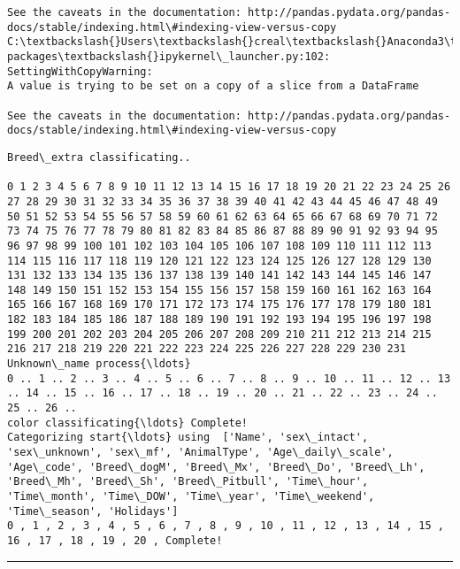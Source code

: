 \documentclass[11pt]{article}
\begin{document}
\begin{Verbatim}[commandchars=\\\{\}]
See the caveats in the documentation: http://pandas.pydata.org/pandas-docs/stable/indexing.html\#indexing-view-versus-copy
C:\textbackslash{}Users\textbackslash{}creal\textbackslash{}Anaconda3\textbackslash{}lib\textbackslash{}site-packages\textbackslash{}ipykernel\_launcher.py:102: SettingWithCopyWarning: 
A value is trying to be set on a copy of a slice from a DataFrame

See the caveats in the documentation: http://pandas.pydata.org/pandas-docs/stable/indexing.html\#indexing-view-versus-copy

    \end{Verbatim}

    \begin{Verbatim}[commandchars=\\\{\}]
Breed\_extra classificating..

0 1 2 3 4 5 6 7 8 9 10 11 12 13 14 15 16 17 18 19 20 21 22 23 24 25 26 27 28 29 30 31 32 33 34 35 36 37 38 39 40 41 42 43 44 45 46 47 48 49 50 51 52 53 54 55 56 57 58 59 60 61 62 63 64 65 66 67 68 69 70 71 72 73 74 75 76 77 78 79 80 81 82 83 84 85 86 87 88 89 90 91 92 93 94 95 96 97 98 99 100 101 102 103 104 105 106 107 108 109 110 111 112 113 114 115 116 117 118 119 120 121 122 123 124 125 126 127 128 129 130 131 132 133 134 135 136 137 138 139 140 141 142 143 144 145 146 147 148 149 150 151 152 153 154 155 156 157 158 159 160 161 162 163 164 165 166 167 168 169 170 171 172 173 174 175 176 177 178 179 180 181 182 183 184 185 186 187 188 189 190 191 192 193 194 195 196 197 198 199 200 201 202 203 204 205 206 207 208 209 210 211 212 213 214 215 216 217 218 219 220 221 222 223 224 225 226 227 228 229 230 231 
Unknown\_name process{\ldots}
0 .. 1 .. 2 .. 3 .. 4 .. 5 .. 6 .. 7 .. 8 .. 9 .. 10 .. 11 .. 12 .. 13 .. 14 .. 15 .. 16 .. 17 .. 18 .. 19 .. 20 .. 21 .. 22 .. 23 .. 24 .. 25 .. 26 .. 
color classificating{\ldots} Complete!
Categorizing start{\ldots} using  ['Name', 'sex\_intact', 'sex\_unknown', 'sex\_mf', 'AnimalType', 'Age\_daily\_scale', 'Age\_code', 'Breed\_dogM', 'Breed\_Mx', 'Breed\_Do', 'Breed\_Lh', 'Breed\_Mh', 'Breed\_Sh', 'Breed\_Pitbull', 'Time\_hour', 'Time\_month', 'Time\_DOW', 'Time\_year', 'Time\_weekend', 'Time\_season', 'Holidays']
0 , 1 , 2 , 3 , 4 , 5 , 6 , 7 , 8 , 9 , 10 , 11 , 12 , 13 , 14 , 15 , 16 , 17 , 18 , 19 , 20 , Complete!

    \end{Verbatim}

    \begin{center}\rule{0.5\linewidth}{\linethickness}\end{center}
\end{document}
